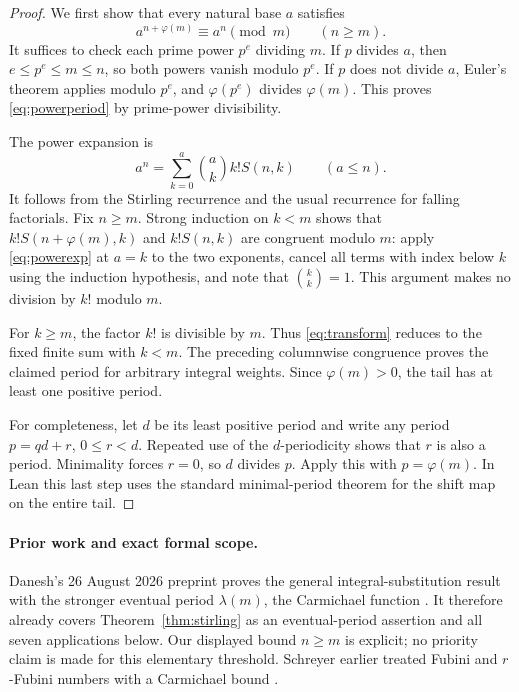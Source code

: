 \documentclass[11pt,a4paper]{article}
\theoremstyle{remark}
\begin{document}
\begin{proof}
We first show that every natural base $a$ satisfies
\begin{equation}\label{eq:powerperiod}
a^{n+\varphi(m)}\equiv a^n\pmod m\qquad(n\ge m).
\end{equation}
It suffices to check each prime power $p^e$ dividing $m$. If $p$ divides
$a$, then $e\le p^e\le m\le n$, so both powers vanish modulo $p^e$.
If $p$ does not divide $a$, Euler's theorem applies modulo $p^e$,
and $\varphi(p^e)$ divides $\varphi(m)$. This proves
\eqref{eq:powerperiod} by prime-power divisibility.

The power expansion is
\begin{equation}\label{eq:powerexp}
a^n=\sum_{k=0}^{a}\binom ak k!S(n,k)\qquad(a\le n).
\end{equation}
It follows from the Stirling recurrence and the usual recurrence for
falling factorials. Fix $n\ge m$. Strong induction on $k<m$ shows
that $k!S(n+\varphi(m),k)$ and $k!S(n,k)$ are congruent modulo $m$:
apply \eqref{eq:powerexp} at $a=k$ to the two exponents, cancel all
terms with index below $k$ using the induction hypothesis, and note
that $\binom kk=1$. This argument makes no division by $k!$ modulo
$m$.

For $k\ge m$, the factor $k!$ is divisible by $m$. Thus
\eqref{eq:transform} reduces to the fixed finite sum with $k<m$.
The preceding columnwise congruence proves the claimed period for
arbitrary integral weights. Since $\varphi(m)>0$, the tail has at
least one positive period.

For completeness, let $d$ be its least positive period and write any
period $p=qd+r$, $0\le r<d$. Repeated use of the $d$-periodicity
shows that $r$ is also a period. Minimality forces $r=0$, so $d$ divides
$p$. Apply this with $p=\varphi(m)$. In Lean this last step uses the
standard minimal-period theorem for the shift map on the entire tail.
\end{proof}

\paragraph{Prior work and exact formal scope.}
Danesh's 26 August 2026 preprint proves the general integral-substitution
result with the stronger eventual period $\lambda(m)$, the Carmichael
function \cite{danesh}. It therefore already covers Theorem~\ref{thm:stirling}
as an eventual-period assertion and all seven applications below.
Our displayed bound $n\ge m$ is explicit; no priority claim is made
for this elementary threshold. Schreyer earlier treated Fubini and
$r$-Fubini numbers with a Carmichael bound \cite{schreyer}.
\end{document}
